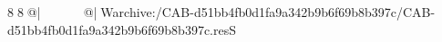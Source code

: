 8  8  @|                                                  @| W   archive:/CAB-d51bb4fb0d1fa9a342b9b6f69b8b397c/CAB-d51bb4fb0d1fa9a342b9b6f69b8b397c.resS 